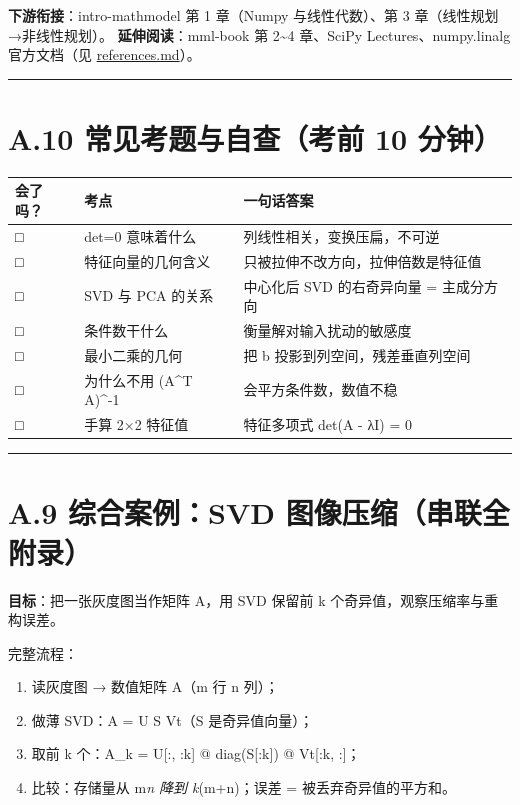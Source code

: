 \textbf{下游衔接}：intro-mathmodel 第 1 章（Numpy 与线性代数）、第 3
章（线性规划→非线性规划）。 \textbf{延伸阅读}：mml-book 第
2\textasciitilde4 章、SciPy Lectures、numpy.linalg 官方文档（见
\href{./references.md}{references.md}）。

\begin{center}\rule{0.5\linewidth}{0.5pt}\end{center}

\section{A.10 常见考题与自查（考前 10
分钟）}\label{a.10-ux5e38ux89c1ux8003ux9898ux4e0eux81eaux67e5ux8003ux524d-10-ux5206ux949f}

{\def\LTcaptype{none} %
\begin{longtable}[]{@{}lll@{}}
\toprule\noalign{}
会了吗？ & 考点 & 一句话答案 \\
\midrule\noalign{}
\endhead
\bottomrule\noalign{}
\endlastfoot
□ & det=0 意味着什么 & 列线性相关，变换压扁，不可逆 \\
□ & 特征向量的几何含义 & 只被拉伸不改方向，拉伸倍数是特征值 \\
□ & SVD 与 PCA 的关系 & 中心化后 SVD 的右奇异向量 = 主成分方向 \\
□ & 条件数干什么 & 衡量解对输入扰动的敏感度 \\
□ & 最小二乘的几何 & 把 b 投影到列空间，残差垂直列空间 \\
□ & 为什么不用 (A\^{}T A)\^{}-1 & 会平方条件数，数值不稳 \\
□ & 手算 2×2 特征值 & 特征多项式 det(A - λI) = 0 \\
\end{longtable}
}

\begin{center}\rule{0.5\linewidth}{0.5pt}\end{center}

\section{A.9 综合案例：SVD
图像压缩（串联全附录）}\label{a.9-ux7efcux5408ux6848ux4f8bsvd-ux56feux50cfux538bux7f29ux4e32ux8054ux5168ux9644ux5f55}

\textbf{目标}：把一张灰度图当作矩阵 A，用 SVD 保留前 k
个奇异值，观察压缩率与重构误差。

完整流程：

\begin{enumerate}
\def\labelenumi{\arabic{enumi}.}
\tightlist
\item
  读灰度图 → 数值矩阵 A（m 行 n 列）；
\item
  做薄 SVD：A = U S Vt（S 是奇异值向量）；
\item
  取前 k 个：A\_k = U{[}:, :k{]} @ diag(S{[}:k{]}) @ Vt{[}:k, :{]}；
\item
  比较：存储量从 m\emph{n 降到 k}(m+n)；误差 = 被丢弃奇异值的平方和。
\end{enumerate}


